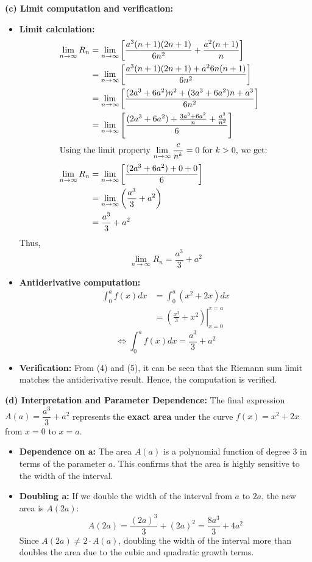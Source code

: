 \textbf{(c) Limit computation and verification:}
    \begin{itemize} 
    \item \textbf{Limit calculation:}
    \begin{align*}
        \lim_{n\to \infty} R_n &= \lim_{n\to \infty} \left[\frac{a^3 (n+1)(2n+1)}{6n^2} + \frac{a^2 (n+1)}{n} \right] \\
        &= \lim_{n\to \infty} \left[\frac{a^3 (n+1)(2n+1) + a^2 6n(n+1)}{6n^2} \right] \\
        &= \lim_{n\to \infty} \left[\frac{(2a^3 + 6a^2)n^2 + (3a^3 + 6a^2)n + a^3}{6n^2} \right] \\
        &= \lim_{n\to \infty} \left[\frac{(2a^3 + 6a^2) + \frac{3a^3 + 6a^2}{n} + \frac{a^3}{n^2}}{6} \right] \\
        \intertext{Using the limit property $\displaystyle\lim_{n \to \infty} \frac{c}{n^k} = 0$ for $k > 0$, we get: } 
        \lim_{n\to \infty} R_n &= \lim_{n\to \infty} \left[\frac{(2a^3 + 6a^2) + 0 + 0}{6} \right] \\
        &= \lim_{n\to \infty} \left(\frac{a^3}{3} + a^2\right) \\
        &= \frac{a^3}{3} + a^2 
    \end{align*}
    Thus, \begin{equation}
    \lim_{n\to \infty} R_n = \frac{a^3}{3} + a^2
    \end{equation}
    \item \textbf{Antiderivative computation:}
    \begin{align*}
        \int_0^af(x)dx &= \int_0^a (x^2 + 2x)dx \\
        &= \left. \left(\frac{x^3}{3} + x^2\right) \right|_{x=0}^{x=a}
    \end{align*}
    \begin{equation}
        \Longleftrightarrow \int_0^af(x)dx  = \frac{a^3}{3} + a^2
    \end{equation}
    \item \textbf{Verification:}
    From (4) and (5), it can be seen that the Riemann sum limit matches the antiderivative result. Hence, the computation is verified.
    \end{itemize}
    
\textbf{(d) Interpretation and Parameter Dependence:}
    The final expression $A(a) = \dfrac{a^3}{3} + a^2$ represents the \textbf{exact area} under the curve $f(x)=x^2+2x$ from $x=0$ to $x=a$.
    
    \begin{itemize}
        \item \textbf{Dependence on $\mathbf{a}$:} The area $A(a)$ is a polynomial function of degree 3 in terms of the parameter $a$. This confirms that the area is highly sensitive to the width of the interval.
    
        \item \textbf{Doubling $\mathbf{a}$:} If we double the width of the interval from $a$ to $2a$, the new area is $A(2a)$:
        \[
        A(2a) = \frac{(2a)^3}{3} + (2a)^2 = \frac{8a^3}{3} + 4a^2
        \]
        Since $A(2a) \neq 2 \cdot A(a)$, doubling the width of the interval more than doubles the area due to the cubic and quadratic growth terms.
    \end{itemize}
\pagebreak
